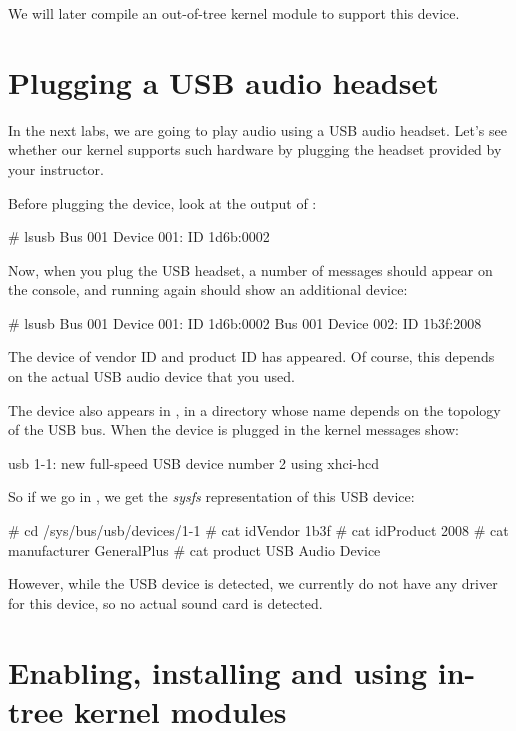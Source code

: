 We will later compile an out-of-tree kernel module to support this device.

\section{Plugging a USB audio headset}

In the next labs, we are going to play audio using a USB audio headset.
Let's see whether our kernel supports such hardware by plugging the
headset provided by your instructor.

Before plugging the device, look at the output of :

\begin{bashinput}
# lsusb
Bus 001 Device 001: ID 1d6b:0002
\end{bashinput}

Now, when you plug the USB headset, a number of messages should appear
on the console, and running  again should show an
additional device:

\begin{bashinput}
# lsusb
Bus 001 Device 001: ID 1d6b:0002
Bus 001 Device 002: ID 1b3f:2008
\end{bashinput}

The device of vendor ID  and product ID  has
appeared. Of course, this depends on the actual USB audio device
that you used.

The device also appears in , in a
directory whose name depends on the topology of the USB bus. When the
device is plugged in the kernel messages show:

\begin{bashinput}
usb 1-1: new full-speed USB device number 2 using xhci-hcd
\end{bashinput}

So if we go in , we get the {\em
sysfs} representation of this USB device:

\begin{bashinput}
# cd /sys/bus/usb/devices/1-1
# cat idVendor
1b3f
# cat idProduct
2008
# cat manufacturer
GeneralPlus
# cat product
USB Audio Device
\end{bashinput}

However, while the USB device is detected, we currently do not have
any driver for this device, so no actual sound card is detected.

\section{Enabling, installing and using in-tree kernel modules}

